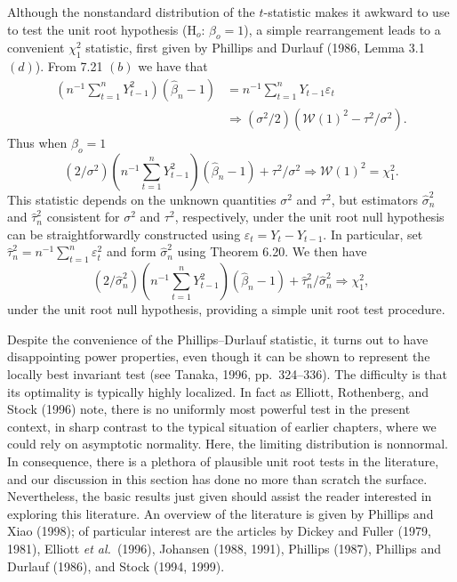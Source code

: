 Although the nonstandard distribution of the $t$-statistic makes it awkward to use to test the unit root hypothesis ($\text{H}_o$: $\beta_o = 1$), a simple rearrangement leads to a convenient $\chi_1^2$ statistic, first given by Phillips and Durlauf (1986, Lemma 3.1 $(d)$). From 7.21 $(b)$ we have that
\begin{align*}
\left(n^{-1}\sum_{t=1}^{n} Y_{t-1}^2\right)(\hat{\beta}_n - 1) &= n^{-1}\sum_{t=1}^{n} Y_{t-1}\varepsilon_t \\
&\Rightarrow (\sigma^2/2)\left(\mathcal{W}(1)^2 - \tau^2/\sigma^2\right).
\end{align*}
Thus when $\beta_o = 1$
\[
(2/\sigma^2)\left(n^{-1}\sum_{t=1}^{n} Y_{t-1}^2\right)(\hat{\beta}_n - 1) + \tau^2/\sigma^2 \Rightarrow \mathcal{W}(1)^2 = \chi_1^2.
\]
This statistic depends on the unknown quantities $\sigma^2$ and $\tau^2$, but estimators $\hat{\sigma}_n^2$ and $\hat{\tau}_n^2$ consistent for $\sigma^2$ and $\tau^2$, respectively, under the unit root null hypothesis can be straightforwardly constructed using $\varepsilon_t = Y_t - Y_{t-1}$. In particular, set $\hat{\tau}_n^2 = n^{-1}\sum_{t=1}^{n} \varepsilon_t^2$ and form $\hat{\sigma}_n^2$ using Theorem 6.20. We then have
\[
(2/\hat{\sigma}_n^2)\left(n^{-1}\sum_{t=1}^{n} Y_{t-1}^2\right)(\hat{\beta}_n - 1) + \hat{\tau}_n^2/\hat{\sigma}_n^2 \Rightarrow \chi_1^2,
\]
under the unit root null hypothesis, providing a simple unit root test procedure.

Despite the convenience of the Phillips--Durlauf statistic, it turns out to have disappointing power properties, even though it can be shown to represent the locally best invariant test (see Tanaka, 1996, pp.\ 324--336). The difficulty is that its optimality is typically highly localized. In fact as Elliott, Rothenberg, and Stock (1996) note, there is no uniformly most powerful test in the present context, in sharp contrast to the typical situation of earlier chapters, where we could rely on asymptotic normality. Here, the limiting distribution is nonnormal. In consequence, there is a plethora of plausible unit root tests in the literature, and our discussion in this section has done no more than scratch the surface. Nevertheless, the basic results just given should assist the reader interested in exploring this literature. An overview of the literature is given by Phillips and Xiao (1998); of particular interest are the articles by Dickey and Fuller (1979, 1981), Elliott \emph{et al.}\ (1996), Johansen (1988, 1991), Phillips (1987), Phillips and Durlauf (1986), and Stock (1994, 1999).

